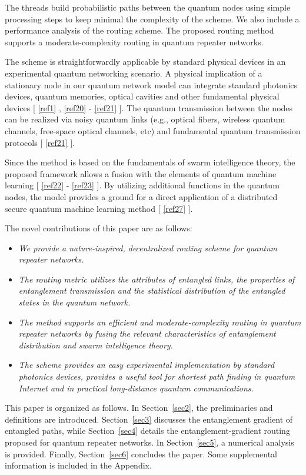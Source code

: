 \documentclass[11pt]{article}%
\newcommand{\sref}[1]{Section~\ref{#1}}
\newcommand*{\cref}[1]{%
  \begingroup
    \hypersetup{
      linkcolor=linkequation,
      linkbordercolor=linkequation,
    }%
    \ref{#1}%
  \endgroup
}
\begin{document}
The threads build probabilistic paths between the quantum nodes using simple processing steps to keep minimal the complexity of the scheme. We also include a performance analysis of the routing scheme. The proposed routing method supports a moderate-complexity routing in quantum repeater networks. 

The scheme is straightforwardly applicable by standard physical devices in an experimental quantum networking scenario. A physical implication of a stationary node in our quantum network model can integrate standard photonics devices, quantum memories, optical cavities and other fundamental physical devices [\cref{ref1}, \cref{ref20}-\cref{ref21}]. The quantum transmission between the nodes can be realized via noisy quantum links (e.g., optical fibers, wireless quantum channels, free-space optical channels, etc) and fundamental quantum transmission protocols [\cref{ref21}]. 

Since the method is based on the fundamentals of swarm intelligence theory, the proposed framework allows a fusion with the elements of quantum machine learning [\cref{ref22}-\cref{ref23}]. By utilizing additional functions in the quantum nodes, the model provides a ground for a direct application of a distributed secure quantum machine learning method [\cref{ref27}]. 

The novel contributions of this paper are as follows: 
\begin{itemize}
\item \textit{We provide a nature-inspired, decentralized routing scheme for quantum repeater networks.}
\item \textit{The routing metric utilizes the attributes of entangled links, the properties of entanglement transmission and the statistical distribution of the entangled states in the quantum network.}
\item \textit{The method supports an efficient and moderate-complexity routing in quantum repeater networks by fusing the relevant characteristics of entanglement distribution and swarm intelligence theory.}
\item \textit{The scheme provides an easy experimental implementation by standard photonics devices, provides a useful tool for shortest path finding in quantum Internet and in practical long-distance quantum communications.}
\end{itemize}

This paper is organized as follows. In \sref{sec2}, the preliminaries and definitions are introduced. \sref{sec3} discusses the entanglement gradient of entangled paths, while \sref{sec4} details the entanglement-gradient routing proposed for quantum repeater networks. In \sref{sec5}, a numerical analysis is provided. Finally, \sref{sec6} concludes the paper. Some supplemental information is included in the Appendix. 
\end{document}
